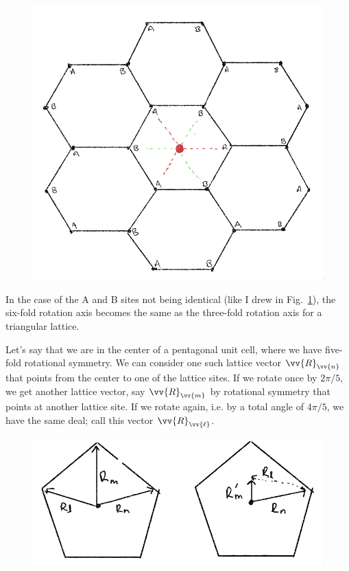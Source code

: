 \begin{parts}
  \begin{figure}[]
    \centering
    \includegraphics[width=0.6\linewidth]{./res/Pics/3_1_c_2.png}
    \caption{}\label{fig:3-1-c-2}
  \end{figure}

  In the case of the A and B sites not being identical (like I drew in Fig.~\ref{fig:3-1-c-2}), the six-fold rotation axis becomes the same as the three-fold rotation axis for a triangular lattice.


\item Let's say that we are in the center of a pentagonal unit cell, where we have five-fold rotational symmetry. We can consider one such lattice vector $\vv{R}_{\vv{n}}$ that points from the center to one of the lattice sites. If we rotate once by $2\pi/5$, we get another lattice vector, say $\vv{R}_{\vv{m}}$ by rotational symmetry that points at another lattice site. If we rotate again, i.e. by a total angle of $4\pi/5$, we have the same deal; call this vector $\vv{R}_{\vv{\ell}}$.

  \begin{figure}[]
    \centering
    \includegraphics[width=0.6\linewidth]{./res/Pics/3-1-d.png}
    \caption{}\label{fig:3-1-d}
  \end{figure}


\end{parts}
